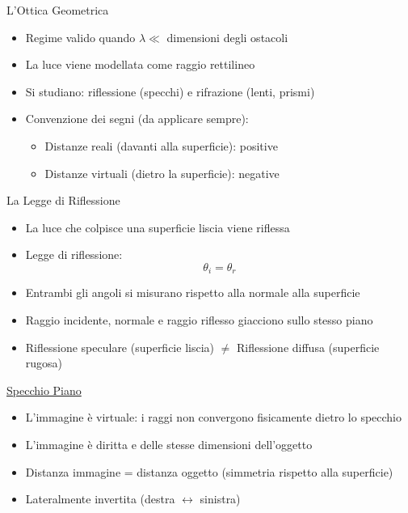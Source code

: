     \begin{frame}{L'Ottica Geometrica}
    \begin{itemize}
        \item Regime valido quando $\lambda \ll$ dimensioni degli ostacoli
        \item La luce viene modellata come raggio rettilineo
        \item Si studiano: riflessione (specchi) e rifrazione (lenti, prismi)
        \item Convenzione dei segni (da applicare sempre):
        \begin{itemize}
            \item Distanze reali (davanti alla superficie): positive
            \item Distanze virtuali (dietro la superficie): negative
        \end{itemize}
        
    \end{itemize}
\end{frame}


\begin{frame}{La Legge di Riflessione}
    \begin{itemize}
        \item La luce che colpisce una superficie liscia viene riflessa
        \item Legge di riflessione:
        $$\theta_i = \theta_r$$
        \item Entrambi gli angoli si misurano rispetto alla normale alla superficie
        \item Raggio incidente, normale e raggio riflesso giacciono sullo stesso piano
        \item Riflessione speculare (superficie liscia) $\neq$ Riflessione diffusa (superficie rugosa)
    \end{itemize}
\end{frame}


\begin{frame}{\href{https://bhuiyanek.github.io/Fisica/riflessione.html?mode=piano}{Specchio Piano}}
    \begin{itemize}
        \item L'immagine è virtuale: i raggi non convergono fisicamente dietro lo specchio
        \item L'immagine è diritta e delle stesse dimensioni dell'oggetto
        \item Distanza immagine = distanza oggetto (simmetria rispetto alla superficie)
        \item Lateralmente invertita (destra $\leftrightarrow$ sinistra) 
    \end{itemize}
\end{frame}


